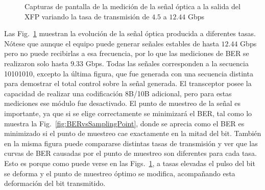 \begin{figure}[!t]
   \qquad
   \qquad
  \caption {Capturas de pantalla de la medición de la señal óptica a la salida del XFP variando la tasa de transmisión de $4.5$ a $12.44$ Gbps}
  \label{fig:ImgTasa}
\end{figure}





Las Fig.~\ref{fig:ImgTasa} muestran la evolución de la señal óptica producida a diferentes
tasas. Nótese que aunque el equipo puede generar señales estables de
hasta $12.44$ Gbps pero no puede recibirlas a esa frecuencia, por lo que las
mediciones de BER se realizaron solo hasta $9.33$ Gbps. Todas las señales
corresponden a la secuencia 10101010, excepto la última figura,
que fue generada con una secuencia distinta para demostrar el total
control sobre la señal generada. El transceptor posee la capacidad de
realizar una codificación 8B/10B adicional, pero para estas mediciones
ese módulo fue desactivado.
El punto de muestreo de la señal es importante, ya que si se elige correctamente se minimizará el BER, tal como lo muestra la Fig.~\ref{fig:BERvsSamplingPoint}, donde se aprecia como el BER es minimizado si el punto de muestreo cae exactamente en la mitad del bit. También en la misma figura puede compararse distintas tasas de transmisión y ver que las curvas de BER causadas por el punto de muestreo son diferentes para cada tasa. Esto es porque como puede verse en las Figs.~\ref{fig:ImgTasa}, a tasas elevadas el pulso del bit se deforma y el punto de muestreo óptimo se modifica, acompañando esta deformación del bit transmitido.


